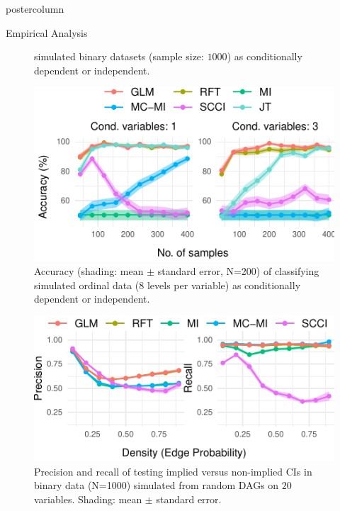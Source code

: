 \documentclass{beamer}
\begin{document}
\begin{frame}
\begin{columns}
\begin{column}{.33\textwidth}
\begin{beamercolorbox}[center]{postercolumn}
\begin{minipage}{.98\textwidth}
{\begin{myblock}{Empirical Analysis}
\begin{figure}
{			simulated binary datasets (sample size: $1000$) as conditionally
			dependent or independent.}
			\label{fig:cat_discrimination}
		\end{figure}
		\begin{figure}
			\centering
			\includegraphics[scale=3]{../in_person/imgs/accuracy_ordinal.pdf}
			\caption{Accuracy (shading: mean $\pm$ standard error, N=200) of
				classifying simulated ordinal data (8 levels per variable) as
				conditionally dependent or independent.}
			\label{fig:accuracy_ord}
		\end{figure}
		\begin{figure}
			\centering
			\includegraphics[scale=3]{../in_person/imgs/model_testing.pdf}
			\caption{Precision and recall of testing implied versus non-implied CIs
				 in binary data (N=1000) simulated from random DAGs on $ 20 $ variables.
				 Shading: mean $\pm$ standard error.} 
			\label{fig:model_testing}
		\end{figure}
	\end{myblock}
		}\end{minipage}\end{beamercolorbox}
	\end{column}



\end{columns}
\end{frame}
\end{document}
